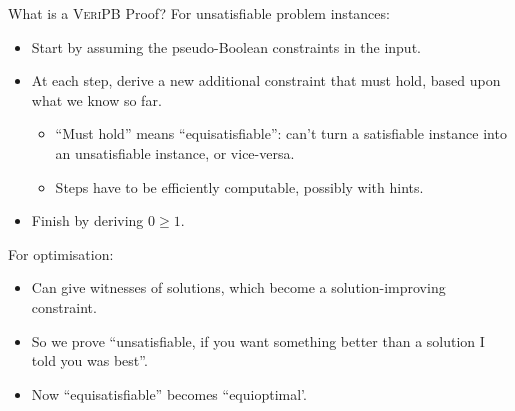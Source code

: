 \documentclass[aspectratio=169,compress,10pt]{beamer}
\makeatletter
\newcommand{\proofsystemformat}[1]{\textsc{#1}\@}
\newcommand{\veripb}{\proofsystemformat{VeriPB}\xspace}
\makeatother
\begin{document}
\begin{frame}{What is a \veripb Proof?}
        For unsatisfiable problem instances:
        \begin{itemize}
            \item Start by assuming the pseudo-Boolean constraints in the input.
            \item At each step, derive a new additional constraint that must hold,
                based upon what we know so far.
                \begin{itemize}
                    \item ``Must hold'' means ``equisatisfiable'': can't turn a satisfiable
                        instance into an unsatisfiable instance, or vice-versa.
                    \item Steps have to be efficiently computable, possibly with hints.
                \end{itemize}
            \item Finish by deriving $0 \ge 1$.
        \end{itemize}

        \bigskip\pause
        For optimisation:
        \begin{itemize}
            \item Can give witnesses of solutions, which become a solution-improving constraint.
            \item So we prove ``unsatisfiable, if you want something better than a
                solution I told you was best''.
            \item Now ``equisatisfiable'' becomes ``equioptimal'.
        \end{itemize}
\end{frame}
\end{document}
